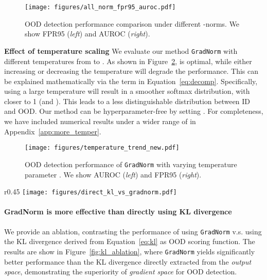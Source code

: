 \documentclass{article}
\begin{document}
\begin{figure}[h]
    \centering
\texttt{[image: figures/all\_norm\_fpr95\_auroc.pdf]}
    \caption{\small{OOD detection performance comparison under different -norms. We show FPR95 (\emph{left}) and AUROC (\emph{right}).}}
\label{fig:norm_ablation}
\end{figure}







\textbf{Effect of temperature scaling} We evaluate our method \texttt{GradNorm} with different temperatures  from  to . As shown in Figure~\ref{fig:temper_ablation},  is optimal, while either increasing or decreasing the temperature will degrade the performance. This can be explained mathematically via the  term in Equation~\ref{eq:decomp}. Specifically, using a large temperature will result in a smoother softmax distribution, with  closer to 1 (and ). This leads to a less distinguishable distribution between ID and OOD. Our method can be hyperparameter-free by setting . For completeness, we have included numerical results under a wider range of  in Appendix~\ref{app:more_temper}.


\begin{figure}[h]
\centering
    \vspace{-0.2cm}
    \texttt{[image: figures/temperature\_trend\_new.pdf]}
\caption{\small{OOD detection performance of \texttt{GradNorm} with varying temperature parameter . We show AUROC (\emph{left}) and FPR95 (\emph{right}).}}
    \label{fig:temper_ablation}
\end{figure}

\begin{wrapfigure}{r}{0.45\textwidth}
\vspace{-1.5cm}
    \texttt{[image: figures/direct\_kl\_vs\_gradnorm.pdf]}
    \vspace{-0.3cm}
    \caption{\small{Comparison between \texttt{GradNorm} v.s. directly using the KL divergence as scoring function.}}
    \vspace{-0.5cm}
    \label{fig:kl_ablation}
\end{wrapfigure}

\vspace{-0.2cm}
\paragraph{{GradNorm} is more effective than directly using KL divergence} We provide an ablation, contrasting the performance of using \texttt{GradNorm} v.s. using the KL divergence derived from Equation~\ref{eq:kl} as OOD scoring function. The results are show in Figure~\ref{fig:kl_ablation}, where \texttt{GradNorm} yields significantly better performance than the KL divergence directly extracted from the \emph{output space}, demonstrating the superiority of \emph{gradient space} for OOD detection.
\end{document}
